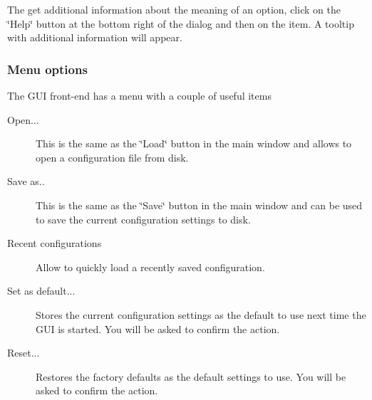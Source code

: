  The get additional information about the meaning of an option, click on the \char`\"{}Help\char`\"{} button at the bottom right of the dialog and then on the item. A tooltip with additional information will appear.

\subsubsection*{Menu options}

The GUI front-end has a menu with a couple of useful items

 \begin{description}
\item[Open...]This is the same as the \char`\"{}Load\char`\"{} button in the main window and allows to open a configuration file from disk. \item[Save as..]This is the same as the \char`\"{}Save\char`\"{} button in the main window and can be used to save the current configuration settings to disk. \item[Recent configurations]Allow to quickly load a recently saved configuration. \item[Set as default...]Stores the current configuration settings as the default to use next time the GUI is started. You will be asked to confirm the action. \item[Reset...]Restores the factory defaults as the default settings to use. You will be asked to confirm the action. \end{description}
